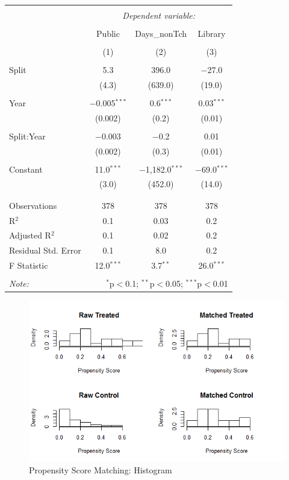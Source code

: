 \documentclass[12pt, a4paper]{article}
\begin{document}
\begin{table}[!htbp] \centering 
  \caption{} 
  \label{} 
\begin{tabular}{@{\extracolsep{5pt}}lccc} 
\\[-1.8ex]\hline 
\hline \\[-1.8ex] 
 & \multicolumn{3}{c}{\textit{Dependent variable:}} \\ 
\cline{2-4} 
\\[-1.8ex] & Public & Days\_nonTch & Library \\ 
\\[-1.8ex] & (1) & (2) & (3)\\ 
\hline \\[-1.8ex] 
 Split & 5.3 & 396.0 & $-$27.0 \\ 
  & (4.3) & (639.0) & (19.0) \\ 
  & & & \\ 
 Year & $-$0.005$^{***}$ & 0.6$^{***}$ & 0.03$^{***}$ \\ 
  & (0.002) & (0.2) & (0.01) \\ 
  & & & \\ 
 Split:Year & $-$0.003 & $-$0.2 & 0.01 \\ 
  & (0.002) & (0.3) & (0.01) \\ 
  & & & \\ 
 Constant & 11.0$^{***}$ & $-$1,182.0$^{***}$ & $-$69.0$^{***}$ \\ 
  & (3.0) & (452.0) & (14.0) \\ 
  & & & \\ 
\hline \\[-1.8ex] 
Observations & 378 & 378 & 378 \\ 
R$^{2}$ & 0.1 & 0.03 & 0.2 \\ 
Adjusted R$^{2}$ & 0.1 & 0.02 & 0.2 \\ 
Residual Std. Error & 0.1 & 8.0 & 0.2 \\ 
F Statistic & 12.0$^{***}$ & 3.7$^{**}$ & 26.0$^{***}$ \\ 
\hline 
\hline \\[-1.8ex] 
\textit{Note:}  & \multicolumn{3}{r}{$^{*}$p$<$0.1; $^{**}$p$<$0.05; $^{***}$p$<$0.01} \\ 
\end{tabular} 
\end{table} 
\begin{figure}[h]
    \centering
    \includegraphics{PSMatch}
    \caption{Propensity Score Matching: Histogram}
    \label{Fig1}
\end{figure}
\end{document}
